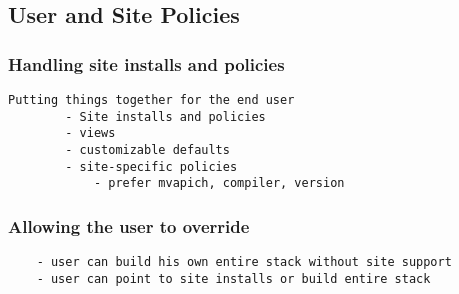
\subsection{User and Site Policies}
\label{sec:usecase-policy}

\subsubsection{Handling site installs and policies}


\begin{verbatim}
Putting things together for the end user
		- Site installs and policies
		- views
		- customizable defaults
		- site-specific policies
			- prefer mvapich, compiler, version
\end{verbatim}

\subsubsection{Allowing the user to override}


\begin{verbatim}
	- user can build his own entire stack without site support
	- user can point to site installs or build entire stack
\end{verbatim}